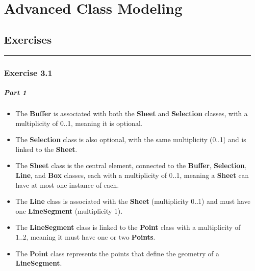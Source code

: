 \chapter{Advanced Class Modeling}
\label{Chapter::AdvancedClassModeling}



\section{Exercises}
\noindent\rule{\textwidth}{0.4pt} %


\subsection{Exercise 3.1}
\paragraph{Part 1}
\begin{itemize}
    \item The \textbf{Buffer} is associated with both the \textbf{Sheet} and \textbf{Selection} classes, with a multiplicity of 0..1, meaning it is optional.
    \item The \textbf{Selection} class is also optional, with the same multiplicity (0..1) and is linked to the \textbf{Sheet}.
    \item The \textbf{Sheet} class is the central element, connected to the \textbf{Buffer}, \textbf{Selection}, \textbf{Line}, and \textbf{Box} classes, each with a multiplicity of 0..1, meaning a \textbf{Sheet} can have at most one instance of each.
    \item The \textbf{Line} class is associated with the \textbf{Sheet} (multiplicity 0..1) and must have one \textbf{LineSegment} (multiplicity 1).
    \item The \textbf{LineSegment} class is linked to the \textbf{Point} class with a multiplicity of 1..2, meaning it must have one or two \textbf{Points}.
    \item The \textbf{Point} class represents the points that define the geometry of a \textbf{LineSegment}.
\end{itemize}

